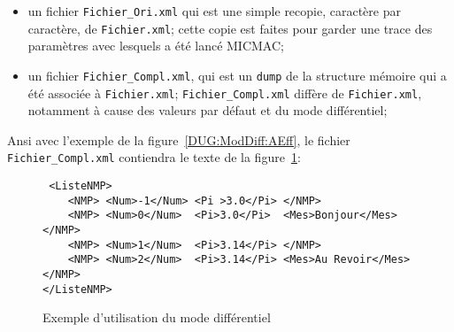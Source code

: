 \begin{itemize}
   \item un fichier {\tt Fichier\_Ori.xml}  qui est une simple
         recopie, caract\`ere par caract\`ere, de {\tt Fichier.xml};
         cette copie est faites pour garder une trace des param\`etres
         avec lesquels a \'et\'e lanc\'e MICMAC;

   \item un fichier {\tt Fichier\_Compl.xml}, qui est un {\tt dump}
         de la structure m\'emoire qui a \'et\'e associ\'ee 
         \`a {\tt Fichier.xml};  {\tt Fichier\_Compl.xml} diff\`ere
         de  {\tt Fichier.xml}, notamment \`a cause des valeurs
         par d\'efaut et du mode diff\'erentiel;
\end{itemize}

Ansi avec l'exemple de la figure~\ref{DUG:ModDiff:AEff},
le fichier {\tt Fichier\_Compl.xml} contiendra le texte
de la figure~\ref{DUG:ModDiff:Compl}:

\begin{figure}
\begin{verbatim}
 <ListeNMP>
    <NMP> <Num>-1</Num> <Pi >3.0</Pi> </NMP>
    <NMP> <Num>0</Num>  <Pi>3.0</Pi>  <Mes>Bonjour</Mes> </NMP>
    <NMP> <Num>1</Num>  <Pi>3.14</Pi> </NMP>
    <NMP> <Num>2</Num>  <Pi>3.14</Pi> <Mes>Au Revoir</Mes> </NMP>
</ListeNMP>
\end{verbatim}
\caption {Exemple d'utilisation du mode diff\'erentiel }
\label{DUG:ModDiff:Compl}

\end{figure}






